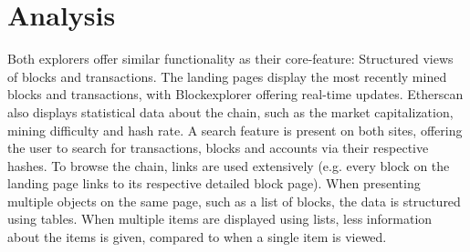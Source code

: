 \section{Analysis} \label{analysis}
Both explorers offer similar functionality as their core-feature: Structured views of blocks and transactions. The landing pages display the most recently mined blocks and transactions, with Blockexplorer offering real-time updates. Etherscan also displays statistical data about the chain, such as the market capitalization, mining difficulty and hash rate. A search feature is present on both sites, offering the user to search for transactions, blocks and accounts via their respective hashes. To browse the chain, links are used extensively (e.g. every block on the landing page links to its respective detailed block page). When presenting multiple objects on the same page, such as a list of blocks, the data is structured using tables. When multiple items are displayed using lists, less information about the items is given, compared to when a single item is viewed.

